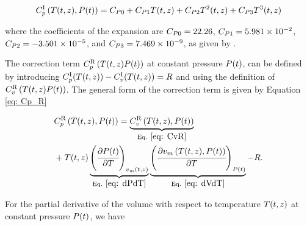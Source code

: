 \documentclass[../Article_Model_Parameters.tex]{subfiles}
\begin{document}
	{\footnotesize
		\begin{equation}
			{\color{black}C_p^{\text{I}}}\left({\color{black}T}(t,z),P(t)\right) = {\color{black}C_{P0}} + {\color{black}C_{P1}}T(t,z) + {\color{black}C_{P2}}{\color{black}T}^2(t,z) + {\color{black}C_{P3}}{\color{black}T}^3(t,z) \label{eq: Cp_I}
	\end{equation} }
	
	where the coefficients of the expansion are ${\color{black}C_{P0}} = 22.26$, ${\color{black}C_{P1}} = 5.981 \times 10^{-2}$, ${\color{black}C_{P2}} = -3.501 \times 10^{-5}$, and ${\color{black}C_{P3}} = 7.469 \times 10^{-9}$, as given by \citet{Kyle1999}. 
	
	The correction term ${\color{black}C_p^{\text{R}}}\left({\color{black}T}(t,z){\color{black}P}(t)\right)$ at constant pressure ${\color{black}P}(t)$, can be defined by introducing  ${\color{black}C_p^{\text{I}}}({\color{black}T}(t,z)) - {\color{black}C_v^{\text{I}}}({\color{black}T}(t,z)) = {\color{black}R}$ and using the definition of ${\color{black}C_v^{\text{R}}}\left({\color{black}T}(t,z){\color{black}P}(t)\right)$. The general form of the correction term is given by Equation \ref{eq: Cp_R}
	
	{\footnotesize	
		\begin{align}
			&{\color{black}C_p^{\text{R}}}\left({\color{black}T}(t,z), {\color{black}P}(t)\right) = \underbrace{{\color{black}C_v^{\text{R}}}\left({\color{black}T}(t,z), {\color{black}P}(t)\right)}_{\text{Eq. }\eqref{eq: CvR}} \nonumber \\
			&+ {\color{black}T}(t,z) \underbrace{\left(\cfrac{\partial {\color{black}P}(t)}{\partial {\color{black}T}}\right)_{{\color{black}v_m}(t,z)}}_{\text{Eq. } \eqref{eq: dPdT}} \underbrace{\left(\cfrac{\partial {\color{black}v_m}\left({\color{black}T}(t,z),{\color{black}P}(t)\right)}{\partial {\color{black}T}}\right)_{{\color{black}P}(t)}}_{\text{Eq. } \eqref{eq: dVdT}} - {\color{black}R}. \label{eq: Cp_R} 
	\end{align} }
	
	
	For the partial derivative of the volume with respect to temperature ${\color{black}T}(t,z)$ at constant pressure ${\color{black}P}(t)$, we have
	
\end{document}
